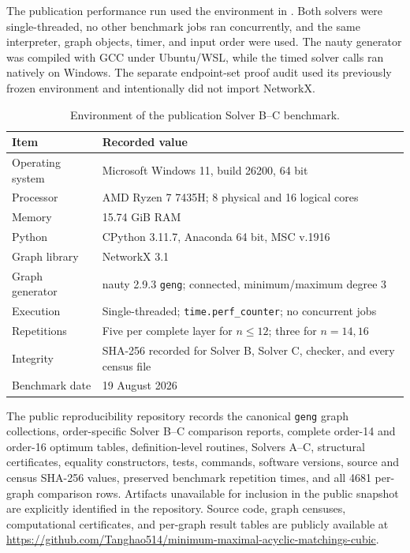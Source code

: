 \documentclass[smallextended,natbib,nospthms]{svjour3}
\theoremstyle{definition}
\theoremstyle{remark}
\begin{document}
The publication performance run used the environment in
. Both solvers were single-threaded, no other
benchmark jobs ran concurrently, and the same interpreter, graph objects,
timer, and input order were used. The nauty generator was compiled with GCC
under Ubuntu/WSL, while the timed solver calls ran natively on Windows. The
separate endpoint-set proof audit used its previously frozen environment and
intentionally did not import NetworkX.

\begin{table}[t]
\centering
\caption{Environment of the publication Solver B--C benchmark.}
\label{tab:benchmark-environment}
\small
\begin{tabularx}{\textwidth}{>{\raggedright\arraybackslash}p{}X}
\toprule
Item & Recorded value\\
\midrule
Operating system & Microsoft Windows 11, build 26200, 64 bit\\
Processor & AMD Ryzen 7 7435H; 8 physical and 16 logical cores\\
Memory & 15.74 GiB RAM\\
Python & CPython 3.11.7, Anaconda 64 bit, MSC v.1916\\
Graph library & NetworkX 3.1 \cite{Hagberg2008}\\
Graph generator & nauty 2.9.3 \texttt{geng}; connected, minimum/maximum degree 3\\
Execution & Single-threaded; \texttt{time.perf\_counter}; no concurrent jobs\\
Repetitions & Five per complete layer for $n\leq12$; three for $n=14,16$\\
Integrity & SHA-256 recorded for Solver B, Solver C, checker, and every census file\\
Benchmark date & 19 August 2026\\
\bottomrule
\end{tabularx}
\end{table}

The public reproducibility repository records the canonical \texttt{geng}
graph collections, order-specific Solver B--C comparison reports, complete
order-14 and order-16 optimum tables, definition-level routines, Solvers A--C,
structural certificates, equality constructors, tests, commands, software
versions, source and census SHA-256 values, preserved benchmark repetition
times, and all 4681 per-graph comparison rows. Artifacts unavailable for
inclusion in the public snapshot are explicitly identified in the repository.
Source code, graph censuses, computational certificates, and per-graph result
tables are publicly available at
\url{https://github.com/Tanghao514/minimum-maximal-acyclic-matchings-cubic}.
\end{document}
